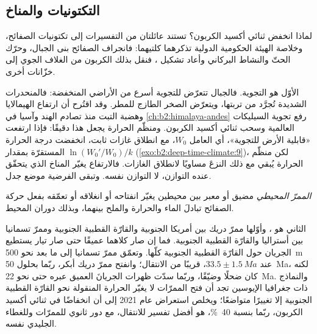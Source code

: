 \subsection*{التكتونيات والمناخ}

لماذا انخفض ثنائي أكسيد الكربون؟ تستند عائلتان من التفسيرات إلى تكتونيات الصفائح، وخلاصة الهيئة
الحكومية الدولية تذكرهما كلتيهما: فانجراف الصفائح بنى الجبال، وحرّك الحتّ والنشاط البركاني
وأعاد تشكيل ، فنقل بذلك الكربون من الغلاف الجوي إلى خزّانات أخرى.

الأوّل هو التجوية. فالجبال تتعرّض للتجوية أسرع من الأراضي المنخفضة: فالمنحدرات الشديدة تُجرَّد من
تربتها، ويتعرّض الصخر الطازج للمطر. وقد اقتُرح أن ارتفاع الهيمالايا وهضبة التبت منذ
تصادم الهند وآسيا في \cref{ch:b2:himalaya-andes} رفع تجوية
السيليكات العالمية وسحب ثنائي أكسيد الكربون. ومنظّم الحرارة يجعل هذا دقيقًا: فإذا ارتفعت
«قابلية الأرض للتجوية»، أي العامل $W_0$، مع انطلاق غازات ثابت، انخفضت درجة الحرارة المستقرّة
بمقدار $\ln(W_0'/W_0)/k$ (\cref{exo:b2:deep-time-climate:9})، لكن منظّم الحرارة يُبقي مع ذلك
النزعَ مساويًا لانطلاق الغازات. فالارتفاع يغيّر المناخ الذي يتحقّق عنده التوازن، لا
التوازن نفسه. وتبقى الفرضية موضع جدل.

\begin{definition}\label{def:b2:deep-time-climate:gateway}
\emph{الممرّ المحيطي} مضيق أو معبر بين محيطين يغيّر انفتاحه
أو انغلاقه أو تعمّقه بفعل حركة الصفائح تبادلَ الماء والحرارة والملح بينهما،
وبذلك دوران المحيط.
\end{definition}

الثاني هو ، وأوّلها ممرّ دريك بين أمريكا الجنوبية والقارّة القطبية الجنوبية
وممرّ تسمانيا بين أستراليا والقارّة القطبية الجنوبية. فما إن صار كلاهما عميقًا حتى صار تيار يستطيع الجريان
حول القارّة القطبية الجنوبية كلّها. وتعمّق ممرّ تسمانيا إلى ما بعد نحو \qty{500}{m} عند $33.5 \pm
\qty{1.5}{Ma}$، قريبًا من الانتقال؛ وانفتح ممرّ دريك أبكر، ربّما بحلول \qty{50}{Ma}،
لكنه كان ضحلًا وضيّقًا، وربّما سدّت ظهرات الجريانَ العميق عبره حتى نحو \qty{22}{Ma}. والنماذج ذات
جغرافيا الإيوسين تجد أن فتح الممرّات لا يغيّر الحرارة المنقولة نحو
القارّة القطبية الجنوبية إلا تغييرًا متواضعًا؛ ويخلص استعراض عام 2021 إلى أن انخفاضًا في ثنائي أكسيد الكربون، ربّما بنسبة
\qty{40}{\percent}، هو أفضل تفسير للانتقال، مع دور ثانوي للممرّات وللغطاء الجليدي
نفسه.

